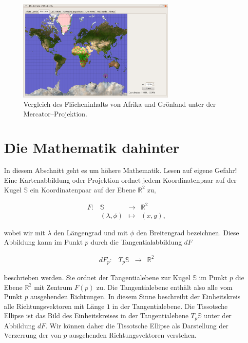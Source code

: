 \documentclass[a4paper,12pt]{article}
\begin{document}
\begin{figure}[ht]
 \begin{center}
  \includegraphics[width=0.7\textwidth]{../common/merc1.png} 
  \caption{Vergleich des Flächeninhalts von Afrika und Grönland unter der 
           Mercator--Projektion.}
 \end{center}
\end{figure}




\newpage
\section{Die Mathematik dahinter}
\label{sec-inside}

\textsf{In diesem Abschnitt geht es um höhere Mathematik. Lesen auf eigene Gefahr!}\\

Eine Kartenabbildung oder Projektion ordnet jedem Koordinatenpaar auf der Kugel 
$\mathbb S$ ein Koordinatenpaar auf der Ebene $\mathbb R^2$ zu,

$$\begin{array}{rccc}
   F: &\mathbb S & \longrightarrow & \mathbb R^2 \\
  & (\lambda, \phi) & \mapsto & (x,y),
  \end{array}
$$

\noindent wobei wir mit $\lambda$ den Längengrad und mit $\phi$ den Breitengrad 
bezeichnen. Diese Abbildung kann im Punkt $p$ durch die Tangentialabbildung $dF$

$$\begin{array}{rccc}
   dF_p: & T_p \mathbb S & \longrightarrow & \mathbb R^2 
  \end{array}
$$

\noindent beschrieben werden. Sie ordnet der Tangentialebene zur Kugel $\mathbb S$ im 
Punkt $p$ die Ebene $\mathbb R^2$ mit Zentrum $F(p)$ zu. Die Tangentialebene enthält 
also alle vom Punkt $p$ ausgehenden Richtungen. In diesem Sinne beschreibt der 
Einheitskreis alle Richtungsvektoren mit Länge $1$ in der Tangentialebene. Die Tissotsche 
Ellipse ist das Bild des Einheitskreises in der Tangentialebene $T_p \mathbb S$ unter der 
Abbildung $dF$. Wir können daher die Tissotsche Ellipse als Darstellung der Verzerrung 
der von $p$ ausgehenden Richtungsvektoren verstehen.
\end{document}
